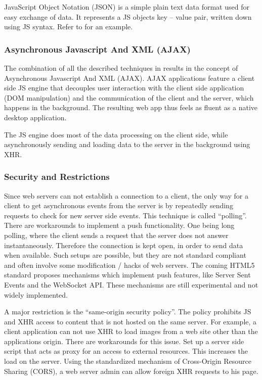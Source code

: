 JavaScript Object Notation (JSON) is a simple plain text data format used for easy exchange of data. It represents a JS objects key -- value pair, written down using JS syntax. Refer to  for an example.



\subsubsection{Asynchronous Javascript And XML (AJAX)}
\label{sec:ajax}

The combination of all the described techniques in  results in the concept of Asynchronous Javascript And XML (AJAX).
AJAX applications feature a client side JS engine that decouples user interaction with the client side application (DOM manipulation) and the communication of the client and the server, which happens in the background.
The resulting web app thus feels as fluent as a native desktop application.

The JS engine does most of the data processing on the client side, while asynchronously sending and loading data to the server in the background using XHR.


\subsubsection{Security and Restrictions}
\label{sec:webapp_security}

Since web servers can not establish a connection to a client, the only way for a client to get asynchronous events from the server is by repeatedly sending requests to check for new server side events.
This technique is called ``polling''.
There are workarounds to implement a push functionality.
One being long polling, where the client sends a request that the server does not answer instantaneously.
Therefore the connection is kept open, in order to send data when available.
Such setups are possible, but they are not standard compliant and often involve some modification / hacks of web servers.
The coming HTML5 standard proposes mechanisms which implement push features, like Server Sent Events and the WebSocket API. These mechanisms are still experimental and not widely implemented.

A major restriction is the ``same-origin security policy''.
The policy prohibits JS and XHR access to content that is not hosted on the same server.
For example, a client application can not use XHR to load images from a web site other than the applications origin.
There are workarounds for this issue. Set up a server side script that acts as proxy for an access to external resources. This increases the load on the server.
Using the standardized mechanism of Cross-Origin Resource Sharing (CORS), a web server admin can allow foreign XHR requests to his page.


